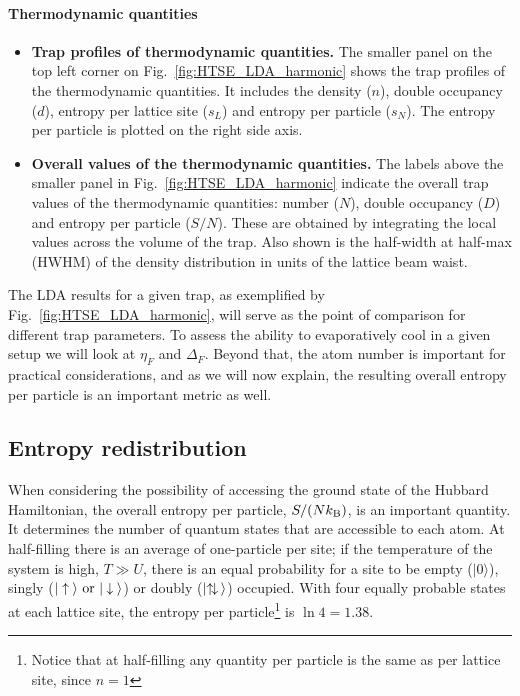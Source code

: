 \paragraph{ Thermodynamic quantities} 

\begin{itemize} 
 
\item \textbf{Trap profiles of thermodynamic quantities.}  The smaller panel on
the top left corner on Fig.~\ref{fig:HTSE_LDA_harmonic} shows the trap profiles
of the thermodynamic quantities.   It includes the density ($n$), double
occupancy ($d$), entropy per lattice site ($s_{L}$) and entropy per particle
($s_{N}$).  The entropy per particle is plotted on the right side axis.

\item \textbf{Overall values of the thermodynamic quantities.} The labels above
the smaller panel in Fig.~\ref{fig:HTSE_LDA_harmonic} indicate the overall trap
values of the thermodynamic quantities: number ($N$), double occupancy ($D$)
and entropy per particle ($S/N$).  These are obtained by integrating the local
values across the volume of the trap.  Also shown is the half-width at half-max
(HWHM) of the density distribution in units of the lattice beam waist.  

\end{itemize}


The LDA results for a given trap, as exemplified by
Fig.~\ref{fig:HTSE_LDA_harmonic}, will serve as the point of comparison for
different trap parameters.  To assess the ability to evaporatively cool in a
given setup we will look at $\eta_{F}$ and $\Delta_{F}$.  Beyond that, the atom
number is important for practical considerations, and as we will now explain,
the resulting overall entropy per particle is an important metric as
well. 


\subsection{ Entropy redistribution }

When considering the possibility of accessing the ground state of the Hubbard
Hamiltonian, the overall entropy per particle, $S/(Nk_{\mathrm{B}})$, is an important
quantity.  It determines the number of quantum states that are accessible to
each atom.  At half-filling there is an average of one-particle per site;  if
the temperature of the system is high, $T\gg U$, there is an equal probability
for a site to be empty ($|0\rangle$), singly ($|\nspup\rangle \ \text{or}\
|\nspdn\rangle$)  or doubly ($|\ndbl\rangle$) occupied.  With four equally
probable states at each lattice site, the entropy per particle\footnote{Notice
that at half-filling any quantity per particle is the same as per lattice site,
since $n=1$}  is $\ln 4 = 1.38$.

